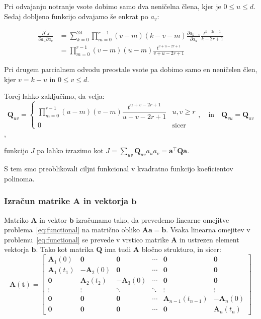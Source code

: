 \documentclass[isrm2, tisk]{fmfdelo}
\newcommand{\qmat}{\mathbf{Q}}
\newcommand{\amat}{\mathbf{A}}
\newcommand{\bvec}{\mathbf{b}}
\newcommand{\avec}{\mathbf{a}}
\newcommand{\tvec}{\mathbf{t}}
\begin{document}
Pri odvajanju notranje vsote dobimo samo dva neničelna člena, kjer je $0 \leq u \leq d$. Sedaj dobljeno funkcijo odvajamo še enkrat po $a_v$:

\begin{equation}
\begin{aligned}
    \frac{\partial^2 J}{\partial a_u \partial a_v} &= \sum_{k=0}^{2d} \prod_{m=0}^{r-1} (v-m)(k-v-m) \frac{\partial a_{k-v}}{\partial a_u} \frac{t^{k-2r+1}}{k-2r+1}\\
    &= \prod_{m=0}^{r-1} (v-m)(u-m) \frac{t^{v+u-2r+1}}{v+u-2r+1}
\end{aligned}
\end{equation}

Pri drugem parcialnem odvodu preostale vsote pa dobimo samo en neničelen člen, kjer $v = k-u$ in $0 \leq v \leq d$.

Torej lahko zaključimo, da velja:
\begin{equation}
    \label{eq:q}
    \qmat_{uv} = \begin{cases}
        \prod_{m=0}^{r-1} (u - m)(v - m) \dfrac{t^{u+v-2r+1}}{u + v - 2r + 1} & u, v \geq r\\
        0 & \text{sicer}
    \end{cases}, \quad \text{in} \quad \qmat_{vu} = \qmat_{uv}
\end{equation},

funkcijo $J$ pa lahko izrazimo kot $J = \sum_{uv} \qmat_{uv} a_u a_v = \avec^\top \qmat \avec$.

S tem smo preoblikovali ciljni funkcional v kvadratno funkcijo koeficientov polinoma.

\subsubsection{Izračun matrike $\amat$ in vektorja $\bvec$}

Matriko $\amat$ in vektor $\bvec$ izračunamo tako, da prevedemo linearne omejitve problema~\eqref{eq:functional} na matrično obliko $\amat \avec = \bvec$. Vsaka linearna omejitev v problemu~\eqref{eq:functional} se prevede v vrstico matrike $\amat$ in ustrezen element vektorja $\bvec$. Tako kot matrika $\qmat$ ima tudi $\amat$ bločno strukturo, in sicer:
\begin{equation}
    \label{eq:a}
    \amat(\tvec) = 
    \begin{bmatrix}
    \amat_1(0) & \mathbf{0} & \mathbf{0} & \cdots & \mathbf{0} & \mathbf{0} \\
    \amat_1(t_1) & -\amat_2(0) & \mathbf{0} & \cdots & \mathbf{0} & \mathbf{0} \\
    \mathbf{0} & \amat_2(t_2) & - \amat_3(0) & \cdots & \mathbf{0} & \mathbf{0} \\
    \vdots & \vdots & \ddots & \ddots & \vdots & \vdots \\
    \mathbf{0} & \mathbf{0} & \mathbf{0} &\cdots & \amat_{n-1}(t_{n-1}) & -\amat_n(0) \\
    \mathbf{0} & \mathbf{0} & \mathbf{0} &\cdots & \mathbf{0} & \amat_n(t_n)
    \end{bmatrix}
\end{equation}
\end{document}
